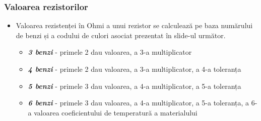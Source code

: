 \documentclass[xcolor={table}]{beamer}
\begin{document}
	\begin{frame}
	    \frametitle{Valoarea rezistorilor}
	    \begin{itemize}
	        \item Valoarea rezistenței în Ohmi a unui rezistor se calculează pe baza numărului de benzi și a codului de culori asociat prezentat în slide-ul următor.
	        \begin{itemize}
	            \item \textit{\textbf{3 benzi}} - primele 2 dau valoarea, a 3-a multiplicator
	            \item \textit{\textbf{4 benzi}} - primele 2 dau valoarea, a 3-a multiplicator, a 4-a toleranța
	            \item \textit{\textbf{5 benzi}} - primele 3 dau valoarea, a 4-a multiplicator, a 5-a toleranța
	            \item \textit{\textbf{6 benzi}} - primele 3 dau valoarea, a 4-a multiplicator, a 5-a toleranța, a 6-a valoarea coeficientului de temperatură a materialului
	        \end{itemize}
	    \end{itemize}
	\end{frame}
\end{document}
